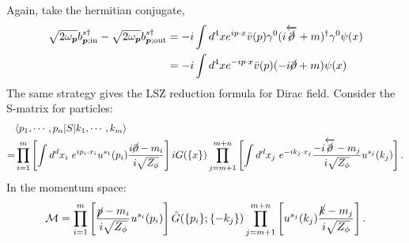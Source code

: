 Again, take the hermitian conjugate,
\begin{equation}
\begin{aligned}
	\sqrt{2\omega_{\bm p}}b^{s \dagger}_{\bm p;\mathrm{in}} - 
	\sqrt{2\omega_{\bm p}}b^{s \dagger}_{\bm p;\mathrm{out}} 
	&= -i\int d^4x e^{ip\cdot x}\bar v(p)\gamma^0(i\overleftarrow{\cancel\partial} + m)^\dagger \gamma^0 \psi(x) \\
	&= -i\int d^4x e^{-ip\cdot x}\bar v(p)(-i \cancel\partial + m) \psi(x)
\end{aligned}
\end{equation}
The same strategy gives the LSZ reduction formula for Dirac field.
Consider the S-matrix for particles:
\begin{equation}
\begin{aligned}
	& \langle p_1, \cdots, p_n| S |k_1, \cdots, k_m\rangle  \\
	=& \prod_{i=1}^{m}\left[ \int d^dx_i \ e^{ip_i\cdot x_i} u^{s_1}(p_i)\frac{i\cancel\partial-m_i}{i\sqrt{Z_\phi}}\right] iG(\{x\})
	\prod_{j=m+1}^{m+n}\left[\int d^dx_j \ e^{-ik_j\cdot x_j}\frac{-i\overleftarrow{\cancel\partial}-m_j}{i\sqrt{Z_\phi}}u^{s_j}(k_j)\right].
\end{aligned}
\end{equation}
In the momentum space:
\begin{equation}
	\mathcal M = \prod_{i=1}^{m}\left[\frac{\cancel p-m_i}{i\sqrt{Z_\phi}}u^{s_i}(p_i)\right]
		\tilde{G}(\{p_i\};\{-k_j\})
		\prod_{j=m+1}^{m+n}\left[u^{s_j}(k_j)\frac{\cancel k-m_j}{i\sqrt{Z_\phi}}\right].
\end{equation}




